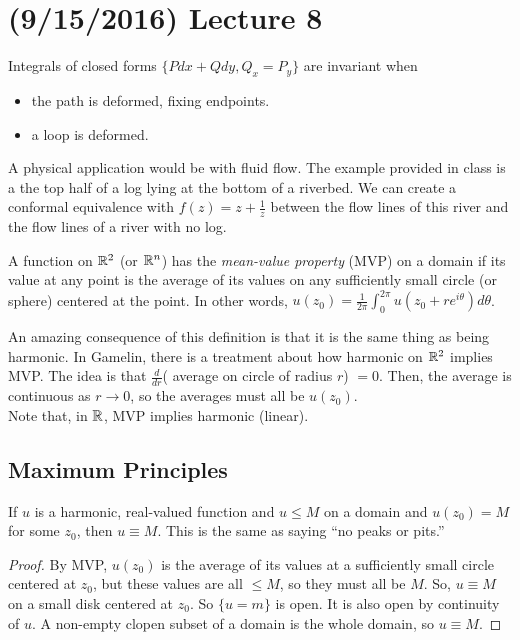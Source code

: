 \documentclass[11pt,leqno,oneside]{amsart}
\numberwithin{thm}{section}
\begin{document}
  \section{(9/15/2016) Lecture 8}
  Integrals of closed forms $\{Pdx+Qdy, Q_x = P_y\}$ are invariant
  when
  \begin{itemize}
  \item the path is deformed, fixing endpoints.
  \item a loop is deformed.
  \end{itemize}

  A physical application would be with fluid flow. The example
  provided in class is a the top half of a log lying at the bottom of
  a riverbed. We can create a conformal equivalence with $f(z) =
  z+\frac{1}{z}$ between the flow lines of this river and the flow
  lines of a river with no log.

  \begin{defn}
    A function on ${\mathbb R}^2$ (or ${\mathbb R}^n$) has the \emph{mean-value
      property} (MVP) on a domain if its value at any point is the
    average of its values on any sufficiently small circle (or sphere)
    centered at the point. In other words, $u(z_0) = \frac{1}{2\pi}
    \int_0^{2\pi} u(z_0+re^{i\theta}) d\theta$.
  \end{defn}
  An amazing consequence of this definition is that it is the same
  thing as being harmonic. In Gamelin, there is a treatment about how
  harmonic on ${\mathbb R}^2$ implies MVP. The idea is that $\frac{d}{dr}$(
  average on circle of radius $r$) $=0$. Then, the average is
  continuous as $r \to 0$, so the averages must all be $u(z_0)$. \\

  Note that, in ${\mathbb R}$, MVP implies harmonic (linear).

  \subsection*{Maximum Principles}

  \begin{thm}
    If $u$ is a harmonic, real-valued function and $u \leq M$ on a
    domain and $u(z_0) = M$ for some $z_0$, then $u \equiv M$. This is
    the same as saying ``no peaks or pits.''
  \end{thm}
  \begin{proof}
    By MVP, $u(z_0)$ is the average of its values at a sufficiently
    small circle centered at $z_0$, but these values are all $\leq M$,
    so they must all be $M$. So, $u \equiv M$ on a small disk centered
    at $z_0$. So $\{u = m\}$ is open. It is also open by continuity of
    $u$. A non-empty clopen subset of a domain is the whole domain, so
    $u \equiv M$.
  \end{proof}
\end{document}
